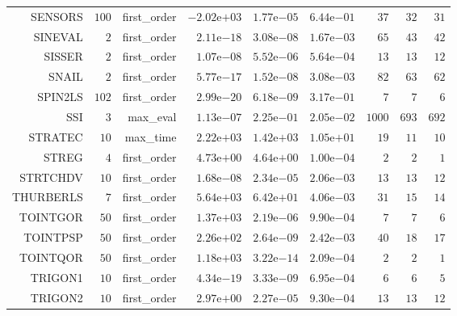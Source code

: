 \begin{longtable}{rrrrrrrrr}
SENSORS & \(   100\) & first\_order & \(-2.02\)e\(+03\) & \( 1.77\)e\(-05\) & \( 6.44\)e\(-01\) & \(    37\) & \(    32\) & \(    31\) \\
SINEVAL & \(     2\) & first\_order & \( 2.11\)e\(-18\) & \( 3.08\)e\(-08\) & \( 1.67\)e\(-03\) & \(    65\) & \(    43\) & \(    42\) \\
SISSER & \(     2\) & first\_order & \( 1.07\)e\(-08\) & \( 5.52\)e\(-06\) & \( 5.64\)e\(-04\) & \(    13\) & \(    13\) & \(    12\) \\
SNAIL & \(     2\) & first\_order & \( 5.77\)e\(-17\) & \( 1.52\)e\(-08\) & \( 3.08\)e\(-03\) & \(    82\) & \(    63\) & \(    62\) \\
SPIN2LS & \(   102\) & first\_order & \( 2.99\)e\(-20\) & \( 6.18\)e\(-09\) & \( 3.17\)e\(-01\) & \(     7\) & \(     7\) & \(     6\) \\
SSI & \(     3\) & max\_eval & \( 1.13\)e\(-07\) & \( 2.25\)e\(-01\) & \( 2.05\)e\(-02\) & \(  1000\) & \(   693\) & \(   692\) \\
STRATEC & \(    10\) & max\_time & \( 2.22\)e\(+03\) & \( 1.42\)e\(+03\) & \( 1.05\)e\(+01\) & \(    19\) & \(    11\) & \(    10\) \\
STREG & \(     4\) & first\_order & \( 4.73\)e\(+00\) & \( 4.64\)e\(+00\) & \( 1.00\)e\(-04\) & \(     2\) & \(     2\) & \(     1\) \\
STRTCHDV & \(    10\) & first\_order & \( 1.68\)e\(-08\) & \( 2.34\)e\(-05\) & \( 2.06\)e\(-03\) & \(    13\) & \(    13\) & \(    12\) \\
THURBERLS & \(     7\) & first\_order & \( 5.64\)e\(+03\) & \( 6.42\)e\(+01\) & \( 4.06\)e\(-03\) & \(    31\) & \(    15\) & \(    14\) \\
TOINTGOR & \(    50\) & first\_order & \( 1.37\)e\(+03\) & \( 2.19\)e\(-06\) & \( 9.90\)e\(-04\) & \(     7\) & \(     7\) & \(     6\) \\
TOINTPSP & \(    50\) & first\_order & \( 2.26\)e\(+02\) & \( 2.64\)e\(-09\) & \( 2.42\)e\(-03\) & \(    40\) & \(    18\) & \(    17\) \\
TOINTQOR & \(    50\) & first\_order & \( 1.18\)e\(+03\) & \( 3.22\)e\(-14\) & \( 2.09\)e\(-04\) & \(     2\) & \(     2\) & \(     1\) \\
TRIGON1 & \(    10\) & first\_order & \( 4.34\)e\(-19\) & \( 3.33\)e\(-09\) & \( 6.95\)e\(-04\) & \(     6\) & \(     6\) & \(     5\) \\
TRIGON2 & \(    10\) & first\_order & \( 2.97\)e\(+00\) & \( 2.27\)e\(-05\) & \( 9.30\)e\(-04\) & \(    13\) & \(    13\) & \(    12\) \\

\end{longtable}
